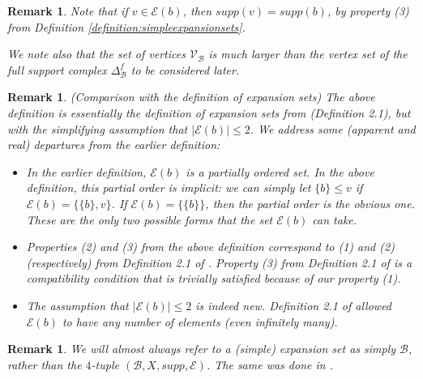 \documentclass{amsart}
\newtheorem{Remark}[theorem]{Remark}
\newtheorem{standing assumption}[theorem]{Standing Assumption}
\newenvironment{remark}{\begin{Remark}\normalfont}{\end{Remark}}
\begin{document}
\begin{remark}
Note that if $v \in \mathcal{E}(b)$, then $supp(v) = supp(b)$, by property (3) from Definition \ref{definition:simpleexpansionsets}.

We note also that the set of vertices $\mathcal{V}_{\mathcal{B}}$ is much larger than the vertex set of the full support complex $\Delta^{f}_{\mathcal{B}}$ to be considered later. 
\end{remark}

\begin{remark} (Comparison with the definition of expansion sets)
The above definition is essentially the definition of expansion sets from \cite{Farley} (Definition 2.1), but with the simplifying assumption that $|\mathcal{E}(b)| \leq 2$. 
We address some (apparent and real) departures from the earlier definition:
\begin{itemize}
\item In the earlier definition, $\mathcal{E}(b)$ is a partially ordered set. In the above definition, this partial order is implicit: we can simply let $\{ b \} \leq v$
if $\mathcal{E}(b) = \{ \{ b \}, v \}$. If $\mathcal{E}(b) = \{ \{ b \} \}$, then the partial order is the obvious one. These are the only two possible forms that the set $\mathcal{E}(b)$ can take.
\item Properties (2) and (3) from the above definition correspond to (1) and (2) (respectively) from Definition 2.1 of \cite{Farley}. Property (3) from Definition 2.1 of \cite{Farley} is a compatibility condition that is trivially satisfied because of our property (1). 
\item The assumption that $|\mathcal{E}(b)| \leq 2$ is indeed new. Definition 2.1 of \cite{Farley} allowed $\mathcal{E}(b)$ to have any number of elements (even infinitely many). 
\end{itemize}
\end{remark}

\begin{remark}
We will almost always refer to a (simple) expansion set as simply $\mathcal{B}$, rather than the $4$-tuple $(\mathcal{B}, X, supp, \mathcal{E})$. The same was done in \cite{Farley}.
\end{remark}
\end{document}
